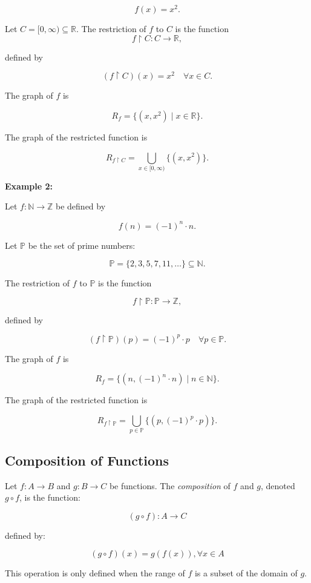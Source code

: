 \documentclass[12pt,a4paper,openany]{article}
\begin{document}
\[
f(x) = x^2.
\]

Let $C = [0,\infty) \subseteq \mathbb{R}$. The restriction of $f$ to $C$ is the function
\[
f\!\restriction C : C \to \mathbb{R},
\]

defined by

\[
(f\!\restriction C)(x) = x^2 \quad \forall x \in C.
\]

The graph of $f$ is

\[
R_f = \{ (x, x^2) \mid x \in \mathbb{R} \}.
\]

The graph of the restricted function is

\[
R_{f\!\restriction C}
= \displaystyle\bigcup_{x \in [0,\infty)} \{ (x, x^2) \}.
\]

\textbf{Example 2:} 

Let $f : \mathbb{N} \to \mathbb{Z}$ be defined by

\[
f(n) = (-1)^n \cdot n.
\]

Let $\mathbb{P}$ be the set of prime numbers:

\[
\mathbb{P} = \{2, 3, 5, 7, 11, \dots\} \subseteq \mathbb{N}.
\]

The restriction of $f$ to $\mathbb{P}$ is the function

\[
f\!\restriction \mathbb{P} :\mathbb{P} \to \mathbb{Z},
\]

defined by

\[
(f\!\restriction \mathbb{P})(p) = (-1)^p \cdot p 
\quad \forall p \in \mathbb{P}.
\]

The graph of $f$ is

\[
R_f = \{ (n, (-1)^n \cdot n ) \mid n \in \mathbb{N} \}.
\]

The graph of the restricted function is

\[
R_{f\!\restriction \mathbb{P}}
= \displaystyle\bigcup_{p \in \mathbb{P}} \{ (p, (-1)^p \cdot p ) \}.
\]


\subsection{Composition of Functions}

Let $f: A \to B$ and $g: B \to C$ be functions. The \textit{composition} of $f$ and $g$, denoted $g \circ f$, is the function:

\[
(g \circ f): A \to C
\]

defined by:

\[
(g \circ f)(x) = g(f(x)), \forall x \in A
\]

This operation is only defined when the range of $f$ is a subset of the domain of $g$.
\end{document}
